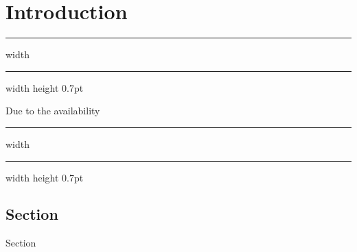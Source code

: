 \chapter{Introduction}
\label{Chapter_1}

\hrule width \hsize \kern 0.4mm \hrule width \hsize height 0.7pt

Due to the availability~\cite{hd_4}

\vspace{4mm}
\hrule width \hsize \kern 0.4mm \hrule width \hsize height 0.7pt


\section{Section}

Section